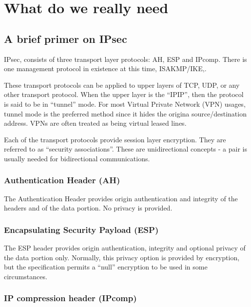 \section{What do we really need}

\subsection{A brief primer on IPsec}

IPsec\cite{RFC2411},\cite{RFC2401} consists of three transport layer protocols:
AH\cite{RFC2402}, ESP\cite{RFC2406} and IPcomp\cite{RFC2507}. There is one
management protocol in existence at this time,
ISAKMP\cite{RFC2408}/IKE\cite{RFC2407},\cite{RFC2409}. 

These transport protocols can be applied to upper layers of TCP, UDP, or any
other transport protocol. When the upper layer is the ``IPIP''\cite{RFC2003},
then the protocol is said to be in ``tunnel'' mode. For most Virtual Private
Network (VPN) usages, tunnel mode is the preferred method since it hides the
origina source/destination address. VPNs are often treated as being virtual
leased lines.

Each of the transport protocols provide session layer encryption. They are
referred to as ``security associations''. These are unidirectional concepts - 
a pair is usually needed for bidirectional communications.

\subsubsection{Authentication Header (AH)}

The Authentication Header provides origin authentication and integrity of the 
headers and of the data portion. No privacy is provided.

\subsubsection{Encapsulating Security Payload (ESP)}

The ESP header provides origin authentication, integrity and optional privacy 
of the data portion only. Normally, this privacy option is provided by
encryption, but the specification permits a ``null'' encryption to be used in 
some circumstances.

\subsubsection{IP compression header (IPcomp)}

